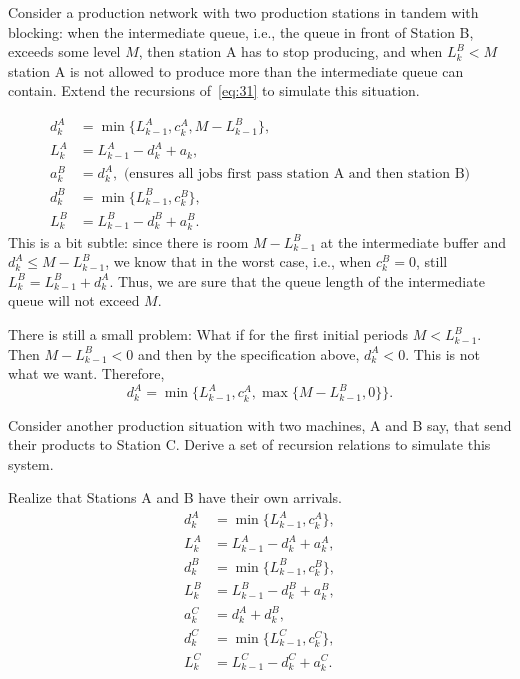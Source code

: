 \begin{extra}
 Consider a production network with two production stations in tandem with blocking: when the intermediate queue, i.e., the queue in front of Station B, exceeds some level $M$, then station A has to stop producing, and when $L^B_k < M$ station A is not allowed to produce more than the intermediate queue can contain.
 Extend the recursions of~\cref{eq:31} to simulate this situation.
\begin{solution}
\begin{equation}
 \begin{split}
 d^A_k &= \min\{L_{k-1}^A, c_k^A, M-L^B_{k-1}\}, \\
 L_k^A &= L_{k-1}^A -d_k^A + a_k, \\
 a_k^B &= d_{k}^A, \text{ (ensures all jobs first pass station A and then station B)}\\
 d^B_k &= \min\{L_{k-1}^B, c_k^B\}, \\
 L_k^B &= L_{k-1}^B -d_k^B + a_k^B.
 \end{split}
\end{equation}
This is a bit subtle: since there is room $M-L^B_{k-1}$ at the
intermediate buffer and $d_k^A \leq M-L^B_{k-1}$, we know that in the
worst case, i.e., when $c_k^B=0$, still $L^B_k = L_{k-1}^B +
d_k^A$.
Thus, we are sure that the queue length of the intermediate queue will
not exceed $M$.

There is still a small problem: What if for the first initial periods $M<L^B_{k-1}$. Then $M-L^B_{k-1}<0$ and then by the specification above, $d_k^A < 0$. This is not what we want. Therefore, 
\begin{equation*}
 d^A_k = \min\{L_{k-1}^A, c_k^A, \max\{M-L^B_{k-1}, 0\}\}.
\end{equation*}
\end{solution}
\end{extra}

\begin{exercise}
 Consider another production situation with two machines, A and B
 say, that send their products to Station C. Derive a set of
 recursion relations to simulate this system. 
\begin{solution}
Realize that Stations A and B have their own arrivals. 
\begin{equation}
 \begin{split}
 d^A_k &= \min\{L_{k-1}^A, c_k^A\}, \\
 L_k^A &= L_{k-1}^A -d_k^A + a_k^A, \\
 d^B_k &= \min\{L_{k-1}^B, c_k^B\}, \\
 L_k^B &= L_{k-1}^B -d_k^B + a_k^B, \\
 a_k^C &= d_{k}^A+d_{k}^B,\\
 d^C_k &= \min\{L_{k-1}^C, c_k^C\}, \\
 L_k^C &= L_{k-1}^C -d_k^C + a_k^C.
 \end{split}
\end{equation}
\end{solution}
\end{exercise}


